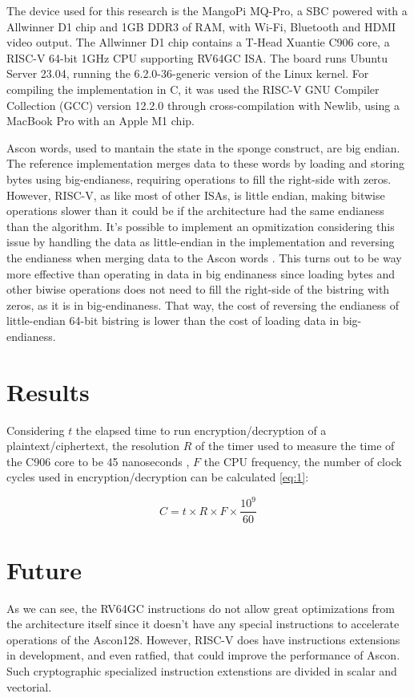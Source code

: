 \documentclass[11pt,twoside]{article}
\begin{document}
The device used for this research is the MangoPi MQ-Pro, a SBC powered with a
Allwinner D1 chip and 1GB DDR3 of RAM, with Wi-Fi, Bluetooth and HDMI video
output. The Allwinner D1 chip contains a T-Head Xuantie C906 core, a RISC-V
64-bit 1GHz CPU supporting RV64GC ISA. The board runs Ubuntu Server 23.04,
running the 6.2.0-36-generic version of the Linux kernel. For compiling the implementation in C, it was used the RISC-V GNU Compiler Collection
(GCC) version 12.2.0 \cite{riscvgnutoolchainv2023} through cross-compilation with Newlib, using a MacBook Pro with an Apple M1 chip.

Ascon words, used to mantain the state in the sponge construct, are big endian. The reference implementation merges data to these words by loading and storing bytes using big-endianess, requiring operations to fill the right-side with zeros. However, RISC-V, as like most of other ISAs, is little endian, making bitwise operations slower than it could be if the architecture had the same endianess than the algorithm. It's possible to implement an opmitization considering this issue by handling the data as little-endian in the implementation and reversing the endianess when merging data to the Ascon words \cite{jellema2019optimizing}. This turns out to be way more effective than operating in data in big endinaness since loading bytes and other biwise operations does not need to fill the right-side of the bistring with zeros, as it is in big-endinaness. That way, the cost of reversing the endianess of little-endian 64-bit bistring is lower than the cost of loading data in big-endianess.

\section{Results}

Considering $t$ the elapsed time to run encryption/decryption of a plaintext/ciphertext, the resolution $R$ of the timer used to measure the time of the C906 core to be 45 nanoseconds  \cite{10179399}, $F$ the CPU frequency, the number of clock cycles used in encryption/decryption can be calculated \cref{eq:1}:

\begin{equation}
  C = t \times R \times F \times \frac{10^{9}}{60} \label{eq:1}
\end{equation}

\section{Future}
As we can see, the RV64GC instructions do not allow great optimizations from the architecture itself since it doesn't have any special instructions to accelerate operations of the Ascon128. However, RISC-V does have instructions extensions in development, and even ratfied, that could improve the performance of Ascon. Such cryptographic specialized instruction extenstions are divided in scalar and vectorial.
\end{document}
